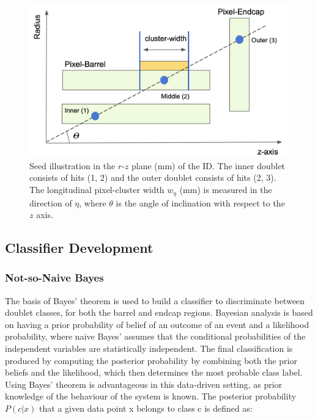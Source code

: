 \begin{figure}[!htbp]
\centering
    \includegraphics[width=0.85\linewidth]{images/4-ml-based-predictor/triplet_illustation.png}
    \caption{Seed illustration in the $r$-$z$ plane (mm) of the ID. The inner doublet consists of hits (1, 2) and the outer doublet consists of hits (2, 3). The longitudinal pixel-cluster width $w_{\eta}$ (mm) is measured in the direction of $\eta$, where $\theta$ is the angle of inclination with respect to the $z$ axis.}
\label{fig:triplet-illustration}
\end{figure}


\subsection{Classifier Development}
\label{section:classifier-dev}

\subsubsection{Not-so-Naive Bayes}

The basis of Bayes’ theorem \cite{naive-bayes} is used to build a classifier to discriminate between doublet classes, for both the barrel and endcap regions. Bayesian analysis is based on having a prior probability of belief of an outcome of an event and a likelihood probability, where naive Bayes’ assumes that the conditional probabilities of the independent variables are statistically independent. The final classification is produced by computing the posterior probability by combining both the prior beliefs and the likelihood, which then determines the most probable class label. Using Bayes’ theorem is advantageous in this data-driven setting, as prior knowledge of the behaviour of the system is known. The posterior probability $P(c|x)$ that a given data point x belongs to class c is defined as:

